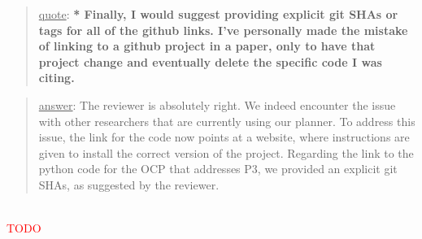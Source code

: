\documentclass[a4paper]{article}
\newcommand{\ndone}[0]{\textcolor{red}{TODO}}
\newcommand\quot[1]{\begin{quote} \underline{quote}: \textbf{#1}\end{quote}}
\newcommand\as[1]{\begin{quote} \underline{answer}: {#1}\end{quote} \leavevmode \\ }
\begin{document}
\quot{* Finally, I would suggest providing explicit git SHAs or tags for all
of the github links. I've personally made the mistake of linking to a
github project in a paper, only to have that project change and
eventually delete the specific code I was citing. }
\as{The reviewer is absolutely right. We indeed encounter the issue with other researchers that are currently using our planner. 
To address this issue, the link for the code now points at a website, where instructions are given to install the correct version of the project.
Regarding the link to the python code for the OCP that addresses P3, we provided an explicit git SHAs, as suggested by the reviewer.}\ndone
\end{document}
